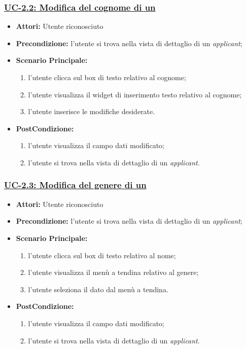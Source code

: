 \subsubsection{\underline{UC-2.2: Modifica del cognome di un \applicant}}
\begin{itemize}
	\item \textbf{Attori:} Utente riconosciuto
	\item \textbf{Precondizione:}  l'utente si trova nella vista di dettaglio di un \textit{applicant};
	\item \textbf{Scenario Principale:}
	\begin{enumerate}
		\item l'utente clicca sul box di testo relativo al cognome;
		\item l'utente visualizza il  widget di inserimento testo relativo al cognome;
		\item l'utente inserisce le modifiche desiderate.
	\end{enumerate}
	\item \textbf{PostCondizione:} 
	\begin{enumerate}
		\item l'utente visualizza il campo dati modificato;
		\item l'utente si trova nella vista di dettaglio di un \textit{applicant}.
	\end{enumerate}
	
\end{itemize}

\subsubsection{\underline{UC-2.3: Modifica del genere di un \applicant}}
\begin{itemize}
	\item \textbf{Attori:} Utente riconosciuto
	\item \textbf{Precondizione:}  l'utente si trova nella vista di dettaglio di un \textit{applicant};
	\item \textbf{Scenario Principale:}
	\begin{enumerate}
		\item l'utente clicca sul box di testo relativo al nome;
		\item l'utente visualizza il  menù a tendina relativo al genere;
		\item l'utente seleziona il dato dal menù a tendina.
	\end{enumerate}
	\item \textbf{PostCondizione:} 
	\begin{enumerate}
		\item l'utente visualizza il campo dati modificato;
		\item l'utente si trova nella vista di dettaglio di un \textit{applicant}.
	\end{enumerate}
	
\end{itemize}

